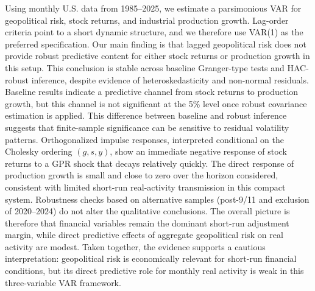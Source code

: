 \documentclass[12pt]{article}
\begin{document}
Using monthly U.S. data from 1985--2025, we estimate a parsimonious VAR for geopolitical risk, stock returns, and industrial production growth. Lag-order criteria point to a short dynamic structure, and we therefore use VAR(1) as the preferred specification.
\newline
Our main finding is that lagged geopolitical risk does not provide robust predictive content for either stock returns or production growth in this setup. This conclusion is stable across baseline Granger-type tests and HAC-robust inference, despite evidence of heteroskedasticity and non-normal residuals.
\newline
Baseline results indicate a predictive channel from stock returns to production growth, but this channel is not significant at the 5\% level once robust covariance estimation is applied. This difference between baseline and robust inference suggests that finite-sample significance can be sensitive to residual volatility patterns.
\newline
Orthogonalized impulse responses, interpreted conditional on the Cholesky ordering $(g,s,y)$, show an immediate negative response of stock returns to a GPR shock that decays relatively quickly. The direct response of production growth is small and close to zero over the horizon considered, consistent with limited short-run real-activity transmission in this compact system.
\newline
Robustness checks based on alternative samples (post-9/11 and exclusion of 2020--2024) do not alter the qualitative conclusions. The overall picture is therefore that financial variables remain the dominant short-run adjustment margin, while direct predictive effects of aggregate geopolitical risk on real activity are modest.
\newline
Taken together, the evidence supports a cautious interpretation: geopolitical risk is economically relevant for short-run financial conditions, but its direct predictive role for monthly real activity is weak in this three-variable VAR framework.
\end{document}
